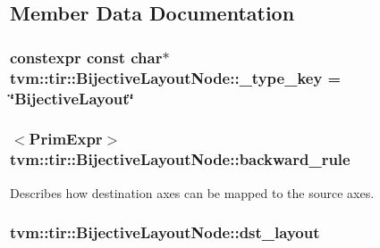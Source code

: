 \subsection{Member Data Documentation}
\subsubsection[{\texorpdfstring{\+\_\+type\+\_\+key}{_type_key}}]{\setlength{\rightskip}{0pt plus 5cm}constexpr const char$\ast$ tvm\+::tir\+::\+Bijective\+Layout\+Node\+::\+\_\+type\+\_\+key = \char`\"{}Bijective\+Layout\char`\"{}\hspace{0.3cm}{\ttfamily [static]}}\hypertarget{classtvm_1_1tir_1_1BijectiveLayoutNode_aff70675c76b7f2caf714c8de10e4167f}{}\label{classtvm_1_1tir_1_1BijectiveLayoutNode_aff70675c76b7f2caf714c8de10e4167f}
\subsubsection[{\texorpdfstring{backward\+\_\+rule}{backward_rule}}]{$<${\bf Prim\+Expr}$>$ tvm\+::tir\+::\+Bijective\+Layout\+Node\+::backward\+\_\+rule}\hypertarget{classtvm_1_1tir_1_1BijectiveLayoutNode_af412c66da78635c724c74c581242d6b0}{}\label{classtvm_1_1tir_1_1BijectiveLayoutNode_af412c66da78635c724c74c581242d6b0}


Describes how destination axes can be mapped to the source axes. 

\subsubsection[{\texorpdfstring{dst\+\_\+layout}{dst_layout}}]{ tvm\+::tir\+::\+Bijective\+Layout\+Node\+::dst\+\_\+layout}\hypertarget{classtvm_1_1tir_1_1BijectiveLayoutNode_a3d5c2dcbfb62a658a7779129aacd8950}{}\label{classtvm_1_1tir_1_1BijectiveLayoutNode_a3d5c2dcbfb62a658a7779129aacd8950}



